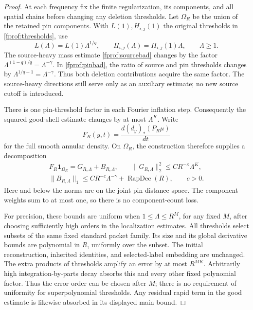 \begin{proof}
At each frequency fix the finite regularization, its components, and all
spatial chains before changing any deletion thresholds. Let \(\Omega_R\)
be the union of the retained pin components. With \(L(1),H_{i,j}(1)\)
the original thresholds in \eqref{fprof:thresholds}, use
\begin{equation}\label{subquad:thresholds}
 L(\Lambda)=L(1)\Lambda^{1/q},\qquad
 H_{i,j}(\Lambda)=H_{i,j}(1)\Lambda,\qquad \Lambda\ge1.
\end{equation}
The source-heavy mass estimate \eqref{fprof:sourcebad} changes by the
factor \(\Lambda^{(1-q)/q}=\Lambda^{-\gamma}\). In
\eqref{fprof:pinbad}, the ratio of source and pin thresholds changes by
\(\Lambda^{1/q-1}=\Lambda^{-\gamma}\). Thus both deletion contributions
acquire the same factor. The source-heavy directions still serve only
as an auxiliary estimate; no new source cutoff is introduced.

There is one pin-threshold factor in each Fourier inflation step.
Consequently the squared good-shell estimate changes by at most
\(\Lambda^K\). Write
\[
 F_R(y,t)=\frac{d(d_y)_*(P_R\mu)}{dt}
\]
for the full smooth annular density. On \(\Omega_R\), the construction
therefore supplies a decomposition
\begin{gather}\label{subquad:regular-decomposition}
 F_R\mathbf1_{\Omega_R}=G_{R,\Lambda}+B_{R,\Lambda},\qquad
 \|G_{R,\Lambda}\|_2^2\le CR^{-\kappa}\Lambda^K,\\
 \|B_{R,\Lambda}\|_1\le CR^{-c}\Lambda^{-\gamma}
       +\operatorname{RapDec}(R),\qquad c>0.\nonumber
\end{gather}
Here and below the norms are on the joint pin-distance space. The component
weights sum to at most one, so there is no component-count loss.

For precision, these bounds are uniform when
\(1\le\Lambda\le R^M\), for any fixed \(M\), after choosing sufficiently
high orders in the localization estimates. All thresholds select subsets
of the same fixed standard packet family. Its size and its global derivative
bounds are polynomial in \(R\), uniformly over the subset. The initial
reconstruction, inherited identities, and selected-label embedding are
unchanged. The extra products of thresholds amplify an error by at most
\(R^{MK}\). Arbitrarily high integration-by-parts decay absorbs this
and every other fixed polynomial factor. Thus the error order can be chosen
after \(M\); there is no requirement of uniformity for superpolynomial
thresholds. Any residual rapid term in the good estimate is likewise
absorbed in its displayed main bound.


\end{proof}
